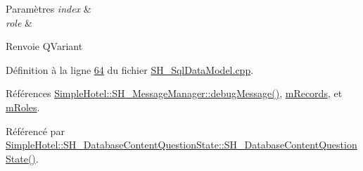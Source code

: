 \begin{DoxyParams}{Paramètres}
{\em index} & \\
\hline
{\em role} & \\
\hline
\end{DoxyParams}
\begin{DoxyReturn}{Renvoie}
Q\-Variant 
\end{DoxyReturn}


Définition à la ligne \hyperlink{SH__SqlDataModel_8cpp_source_l00064}{64} du fichier \hyperlink{SH__SqlDataModel_8cpp_source}{S\-H\-\_\-\-Sql\-Data\-Model.\-cpp}.



Références \hyperlink{classSimpleHotel_1_1SH__MessageManager_ad680f823897b7bf70e46ee18326c08b2}{Simple\-Hotel\-::\-S\-H\-\_\-\-Message\-Manager\-::debug\-Message()}, \hyperlink{classSimpleHotel_1_1SH__SqlDataModel_af73abbb951de936944285571f34407c5}{m\-Records}, et \hyperlink{classSimpleHotel_1_1SH__SqlDataModel_a2a8b95a8c1dc58f69ef1b67ef5247093}{m\-Roles}.



Référencé par \hyperlink{classSimpleHotel_1_1SH__DatabaseContentQuestionState_a91df6c69a129ca799d29610b3332747d}{Simple\-Hotel\-::\-S\-H\-\_\-\-Database\-Content\-Question\-State\-::\-S\-H\-\_\-\-Database\-Content\-Question\-State()}.


